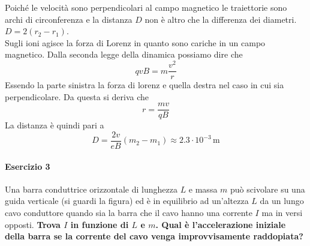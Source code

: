 Poiché le velocità sono perpendicolari al campo magnetico le traiettorie sono archi di circonferenza
e la distanza $D$ non è altro che la differenza dei diametri. $D = 2(r_2-r_1)$.\\
Sugli ioni agisce la forza di Lorenz in quanto sono cariche in un campo magnetico. Dalla seconda legge
della dinamica possiamo dire che
\begin{equation*}
qvB = m\frac{v^2}{r}
\end{equation*}
Essendo la parte sinistra la forza di lorenz e quella destra nel caso in cui sia perpendicolare. Da
questa si deriva che
\begin{equation*}
r = \frac{mv}{qB}
\end{equation*}
La distanza è quindi pari a
\begin{equation*}
D = \frac{2v}{eB}(m_2-m_1) \approx \boxed{2.3\cdot10^{-3}\,\text{m}}
\end{equation*}

\paragraph{Esercizio 3}
Una barra conduttrice orizzontale di lunghezza $L$ e massa $m$ può scivolare su una guida verticale
(si guardi la figura) ed è in equilibrio ad un'altezza $L$ da un lungo cavo conduttore quando sia la
barra che il cavo hanno una corrente $I$ ma in versi opposti. \textbf{Trova $I$ in funzione di $L$ e
$m$. Qual è l'accelerazione iniziale della barra se la corrente del cavo venga improvvisamente
raddopiata?}
\begin{center}
\end{center}
\divisor

